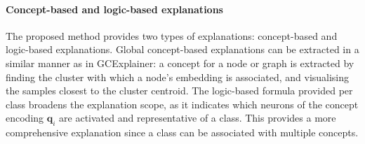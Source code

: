 \documentclass[withindex,glossary]{cam-thesis}
\theoremstyle{plain}
\theoremstyle{definition}
\theoremstyle{remark}
\begin{document}

\paragraph{Concept-based and logic-based explanations}
The proposed method provides two types of explanations: concept-based and logic-based explanations. Global concept-based explanations can be extracted in a similar manner as in GCExplainer: a concept for a node or graph is extracted by finding the cluster with which a node's embedding is associated, and visualising the samples closest to the cluster centroid. The logic-based formula provided per class broadens the explanation scope, as it indicates which neurons of the concept encoding $\mathbf{q}_i$ are activated and representative of a class. This provides a more comprehensive explanation since a class can be associated with multiple concepts. 
\end{document}
